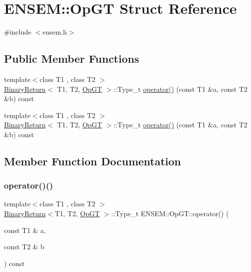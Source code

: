 \hypertarget{structENSEM_1_1OpGT}{}\section{E\+N\+S\+EM\+:\+:Op\+GT Struct Reference}
\label{structENSEM_1_1OpGT}


{\ttfamily \#include $<$ensem.\+h$>$}

\subsection*{Public Member Functions}
\begin{DoxyCompactItemize}
\item 
{\footnotesize template$<$class T1 , class T2 $>$ }\\\mbox{\hyperlink{structENSEM_1_1BinaryReturn}{Binary\+Return}}$<$ T1, T2, \mbox{\hyperlink{structENSEM_1_1OpGT}{Op\+GT}} $>$\+::Type\+\_\+t \mbox{\hyperlink{structENSEM_1_1OpGT_acc420fbf856bae16d2db09a4c622ff4f}{operator()}} (const T1 \&a, const T2 \&b) const
\item 
{\footnotesize template$<$class T1 , class T2 $>$ }\\\mbox{\hyperlink{structENSEM_1_1BinaryReturn}{Binary\+Return}}$<$ T1, T2, \mbox{\hyperlink{structENSEM_1_1OpGT}{Op\+GT}} $>$\+::Type\+\_\+t \mbox{\hyperlink{structENSEM_1_1OpGT_acc420fbf856bae16d2db09a4c622ff4f}{operator()}} (const T1 \&a, const T2 \&b) const
\end{DoxyCompactItemize}


\subsection{Member Function Documentation}
\mbox{\label{structENSEM_1_1OpGT_acc420fbf856bae16d2db09a4c622ff4f}} 
\subsubsection{\texorpdfstring{operator()()}{operator()()}\hspace{0.1cm}{\footnotesize\ttfamily [1/2]}}
{\footnotesize\ttfamily template$<$class T1 , class T2 $>$ \\
\mbox{\hyperlink{structENSEM_1_1BinaryReturn}{Binary\+Return}}$<$T1, T2, \mbox{\hyperlink{structENSEM_1_1OpGT}{Op\+GT}} $>$\+::Type\+\_\+t E\+N\+S\+E\+M\+::\+Op\+G\+T\+::operator() (\begin{DoxyParamCaption}\item[{const T1 \&}]{a,  }\item[{const T2 \&}]{b }\end{DoxyParamCaption}) const\hspace{0.3cm}{\ttfamily [inline]}}

